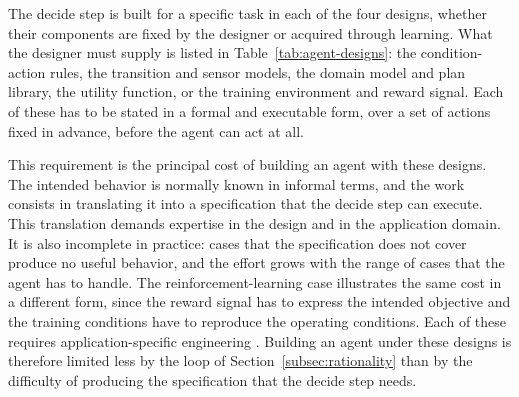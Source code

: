 The decide step is built for a specific task in each of the four designs, whether their components are fixed by the designer or acquired through learning. What the designer must supply is listed in Table~\ref{tab:agent-designs}: the condition-action rules, the transition and sensor models, the domain model and plan library, the utility function, or the training environment and reward signal. Each of these has to be stated in a formal and executable form, over a set of actions fixed in advance, before the agent can act at all.

This requirement is the principal cost of building an agent with these designs. The intended behavior is normally known in informal terms, and the work consists in translating it into a specification that the decide step can execute. This translation demands expertise in the design and in the application domain. It is also incomplete in practice: cases that the specification does not cover produce no useful behavior, and the effort grows with the range of cases that the agent has to handle. The reinforcement-learning case illustrates the same cost in a different form, since the reward signal has to express the intended objective and the training conditions have to reproduce the operating conditions. Each of these requires application-specific engineering \cite{dulac-arnoldChallengesRealWorldReinforcement2019}. Building an agent under these designs is therefore limited less by the loop of Section~\ref{subsec:rationality} than by the difficulty of producing the specification that the decide step needs.
